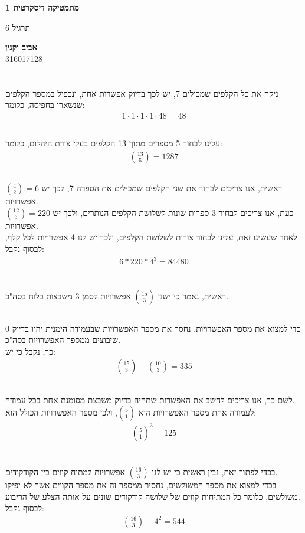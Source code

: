\documentclass[a4paper, 12pt, leqno]{article}
\newcommand{\sub}[1]{\subsection{\underline{#1}}}
\newcommand{\eq}[1]{\begin{align*}#1\end{align*}}
\begin{document}
\begin{titlepage}
    \begin{center}
        \vspace*{4cm}
    
        {\fontsize{32pt}{32pt}\selectfont \textbf{מתמטיקה דיסקרטית 1}}
        
        \vspace{0.4cm}
        
        {\LARGE
        תרגיל 6}
    
        \vfill
            
        {
            \Large\textbf{אביב וקנין}
            \\
            316017128
        }
    \end{center}
\end{titlepage}

\section{}
\sub{}
ניקח את כל הקלפים שמכילים 7, יש לכך בדיוק אפשרות אחת, ונכפיל במספר הקלפים שנשארו בחפיסה, כלומר:
\eq{
    1\cdot1\cdot1\cdot1\cdot48=48
}
\sub{}
עלינו לבחור 5 מספרים מתוך 13 הקלפים בעלי צורת היהלום, כלומר:
\eq{
    \binom{13}{5}=1287
}
\sub{}
ראשית, אנו צריכים לבחור את שני הקלפים שמכילים את הספרה 7, לכך יש $\binom{4}{2}=6$ אפשרויות.\\
כעת, אנו צריכים לבחור 3 ספרות שונות לשלושת הקלפים הנותרים, ולכך יש $\binom{12}{3}=220$ אפשרויות.\\
לאחר שעשינו זאת, עלינו לבחור צורות לשלושת הקלפים, ולכך יש לנו 4 אפשרויות לכל קלף, לבסוף נקבל:
\eq{
    6*220*4^3=84480
}

\section{}
ראשית, נאמר כי ישנן $\binom{15}{3}$ אפשרויות לסמן 3 משבצות בלוח בסה"כ.
\sub{}
כדי למצוא את מספר האפשרויות, נחסר את מספר האפשרויות שבעמודה הימנית יהיו בדיוק 0 שיבוצים ממספר האפשרויות בסה"כ.\\
כך, נקבל כי יש:
\eq{
    \binom{15}{3}-\binom{10}{3}=335
}
\sub{}
לשם כך, אנו צריכים לחשב את האפשרות שתהיה בדיוק משבצת מסומנת אחת בכל עמודה.\\
לעמודה אחת מספר האפשרויות הוא $\binom{5}{1}$, ולכן מספר האפשרויות הכולל הוא:
\eq{
    {\binom{5}{1}}^3=125
}

\section{}
בכדי לפתור זאת, נבין ראשית כי יש לנו $\binom{16}{3}$ אפשרויות למתוח קווים בין הקודקודים.\\
בכדי למצוא את מספר המשולשים, נחסיר ממספר זה את מספר הקווים אשר לא יפיקו משולשים, כלומר כל המתיחות קווים של שלושה קודקודים שונים על אותה הצלע של הריבוע.\\
לבסוף נקבל:
\eq{
    \binom{16}{3}-4^2=544
}
\end{document}
